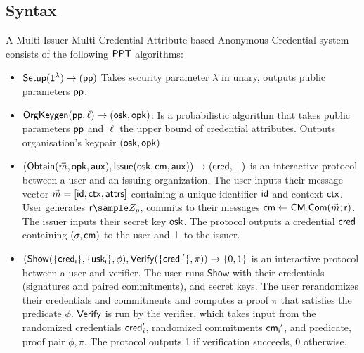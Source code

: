 \subsection{Syntax}
\begin{definition} A Multi-Issuer Multi-Credential Attribute-based Anonymous Credential system consists of the following $\mathsf{PPT}$ algorithms:
    \begin{itemize}
    \item $\mathsf{Setup}(\mathsf{1^{\lambda}}) \to (\mathsf{pp})$ Takes security parameter $\lambda$ in unary, outputs public parameters $\mathsf{pp}$.
    
    \item $\mathsf{OrgKeygen}(\mathsf{pp}, \ell) \to (\mathsf{osk}, \mathsf{opk})$: Is a probabilistic algorithm that takes public parameters $\mathsf{pp}$ and $\ell$ the upper bound of credential attributes. Outputs organisation's keypair $(\mathsf{osk}, \mathsf{opk})$
    
    
    \item $(\mathsf{Obtain}(\vec{m}, \mathsf{opk}, \mathsf{aux}), \mathsf{Issue}(\mathsf{osk}, \mathsf{cm}, \mathsf{aux})) \rightarrow (\mathsf{cred}, \bot)$ is an interactive protocol between a user and an issuing organization. The user inputs their message vector $\vec{m} = [\mathsf{id}, \mathsf{ctx}, \mathsf{attrs}]$ containing a unique identifier $\mathsf{id}$ and context $\mathsf{ctx}$. User generates $\usk \sample Z_p$, commits to their messages $\mathsf{cm} \gets \mathsf{CM.Com}(\vec{m}; \mathsf{r})$. The issuer inputs their secret key $\mathsf{osk}$. The protocol outputs a credential $\mathsf{cred}$ containing $(\sigma, \mathsf{cm})$ to the user and $\bot$ to the issuer.    
    
    \item $(\mathsf{Show}(\{\mathsf{cred_i}\}, \{\mathsf{usk_i}\}, \phi), \mathsf{Verify}(\{\mathsf{cred_i}'\}, \pi)) \rightarrow \{0,1\}$ is an interactive protocol between a user and verifier. The user runs $\mathsf{Show}$ with their credentials (signatures and paired commitments), and secret keys. The user rerandomizes their credentials and commitments and computes a proof $\pi$ that satisfies the predicate $\phi$.
    $\mathsf{Verify}$ is run by the verifier, which takes input from the randomized credentials $\mathsf{cred}_i'$, randomized commitments $\mathsf{cm_i}'$, and predicate, proof pair $\phi, \pi$. The protocol outputs 1 if verification succeeds, 0 otherwise.
    \end{itemize}
\end{definition}

